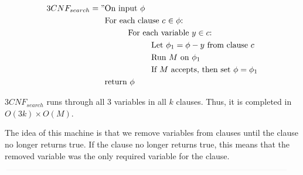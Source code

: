 \documentclass{article}
\newcommand\tab[1][1cm]{\hspace*{#1}}
\begin{document}
\begin{enumerate}
            \begin{equation}
            	\begin{split}
            		3CNF_{search} = "& \text{On input $\phi$} \\
            				         & \text{For each clause $c$ $\in \phi$:} \\
                                     & \tab\text{For each variable $y \in c$:} \\
                                     & \tab\tab\text{Let $\phi_1 = \phi - y$ from clause $c$} \\
                                     & \tab\tab\text{Run $M$ on $\phi_1$} \\
                                     & \tab\tab\text{If $M$ accepts, then set $\phi = \phi_1$} \\
                                     & \text{return $\phi$}
            	\end{split}
            \end{equation}

            $3CNF_{search}$ runs through all 3 variables in all $k$ clauses. Thus, it is completed in $O(3k) \times O(M)$.

            The idea of this machine is that we remove variables from clauses until the clause no longer returns true. If the clause no longer returns true, this means that the removed variable was the only required variable for the clause.

            $\textcolor[RGB]{220,220,220}{\rule{\linewidth}{0.2pt}}$

\end{enumerate}
\end{document}
